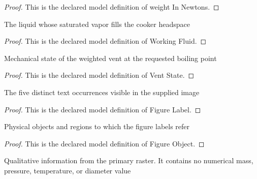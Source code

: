 \begin{proof}
  This is the declared model definition of weight In Newtons.
\end{proof}
\begin{definition}
  \label{def:physics:phyx-mini-0484:phyxminiproblems-problemphyxmini0484-workingfluid}
  The liquid whose saturated vapor fills the cooker headspace
\end{definition}
\begin{proof}
  This is the declared model definition of Working Fluid.
\end{proof}
\begin{definition}
  \label{def:physics:phyx-mini-0484:phyxminiproblems-problemphyxmini0484-ventstate}
  Mechanical state of the weighted vent at the requested boiling point
\end{definition}
\begin{proof}
  This is the declared model definition of Vent State.
\end{proof}
\begin{definition}
  \label{def:physics:phyx-mini-0484:phyxminiproblems-problemphyxmini0484-figurelabel}
  The five distinct text occurrences visible in the supplied image
\end{definition}
\begin{proof}
  This is the declared model definition of Figure Label.
\end{proof}
\begin{definition}
  \label{def:physics:phyx-mini-0484:phyxminiproblems-problemphyxmini0484-figureobject}
  Physical objects and regions to which the figure labels refer
\end{definition}
\begin{proof}
  This is the declared model definition of Figure Object.
\end{proof}
\begin{definition}
  \label{def:physics:phyx-mini-0484:phyxminiproblems-problemphyxmini0484-pressurecookerfigure}
  Qualitative information from the primary raster. It contains no numerical mass, pressure, temperature, or diameter value
\end{definition}
